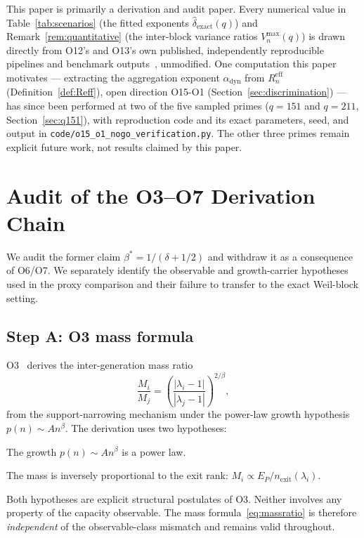 \documentclass[11pt,a4paper]{article}
\newcommand{\dexact}{\hat{\delta}_{\mathrm{exact}}}
\newcommand{\Reff}{R_n^{\mathrm{eff}}}
\newcommand{\bstar}{\beta^{*}}
\begin{document}
This paper is primarily a derivation and audit paper.
Every numerical value in Table~\ref{tab:scenarios} (the fitted exponents
$\dexact(q)$) and Remark~\ref{rem:quantitative} (the inter-block variance
ratios $V_n^{\max}(q)$) is drawn directly from O12's and O13's own
published, independently reproducible pipelines and benchmark
outputs~\cite{Beau2026a16,Beau2026a17}, unmodified.
One computation this paper motivates — extracting the aggregation exponent
$\alpha_{\mathrm{dyn}}$ from $\Reff$ (Definition~\ref{def:Reff}), open
direction O15-O1 (Section~\ref{sec:discrimination}) — has since been
performed at two of the five sampled primes ($q=151$ and $q=211$,
Section~\ref{sec:q151}), with reproduction code and its exact parameters,
seed, and output in \texttt{code/o15\_o1\_nogo\_verification.py}.
The other three primes remain explicit future work, not results claimed by
this paper.

\section{Audit of the O3--O7 Derivation Chain}
\label{sec:audit}

We audit the former claim $\bstar=1/(\delta+1/2)$ and withdraw it as a consequence of O6/O7.
We separately identify the observable and growth-carrier hypotheses used in the proxy comparison
and their failure to transfer to the exact Weil-block setting.

\subsection{Step A: O3 mass formula}
\label{sec:stepA}

O3~\cite{Beau2026a7} derives the inter-generation mass ratio
\begin{equation}
\label{eq:massratio}
\frac{M_i}{M_j}
= \left(\frac{|{\lambda_i - 1}|}{|{\lambda_j - 1}|}\right)^{2/\beta},
\end{equation}
from the support-narrowing mechanism under the power-law growth
hypothesis $p(n) \sim A n^\beta$.
The derivation uses two hypotheses:
\begin{description}[style=nextline]
\item[H-O3-1] The growth $p(n) \sim A n^\beta$ is a power law.
\item[H-O3-2] The mass is inversely proportional to the exit rank:
$M_i \propto E_P / n_{\mathrm{exit}}(\lambda_i)$.
\end{description}
Both hypotheses are explicit structural postulates of O3.
Neither involves any property of the capacity observable.
The mass formula~\eqref{eq:massratio} is therefore \emph{independent}
of the observable-class mismatch and remains valid throughout.
\end{document}
